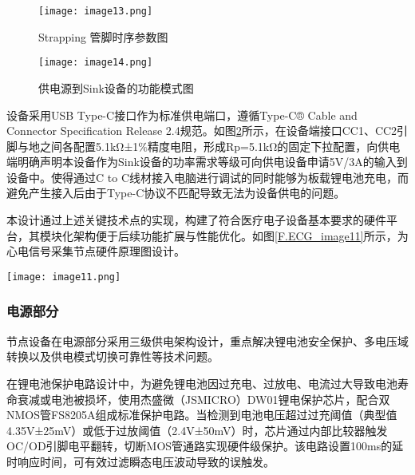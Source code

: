 \begin{figure}[H]
    \centering
    \texttt{[image: image13.png]}
    \caption{Strapping 管脚时序参数图 \cite{espressif2021esp32c3}}
    \label{F.ECG_image13}
\end{figure}

\begin{figure}[hbt]%
    \centering
    \texttt{[image: image14.png]}
    \caption{供电源到Sink设备的功能模式图\cite{usbtypec24}}
    \label{F.ECG_image14}
\end{figure}

设备采用USB Type-C接口作为标准供电端口，遵循Type-C® Cable and Connector Specification Release 2.4规范。如图\ref{F.ECG_image14}所示，在设备端接口CC1、CC2引脚与地之间各配置5.1kΩ±1$\%$精度电阻，形成Rp=5.1kΩ的固定下拉配置，向供电端明确声明本设备作为Sink设备的功率需求等级可向供电设备申请5V/3A的输入到设备中。使得通过C to C线材接入电脑进行调试的同时能够为板载锂电池充电，而避免产生接入后由于Type-C协议不匹配导致无法为设备供电的问题。

本设计通过上述关键技术点的实现，构建了符合医疗电子设备基本要求的硬件平台，其模块化架构便于后续功能扩展与性能优化。如图\ref{F.ECG_image11}所示，为心电信号采集节点硬件原理图设计。

\begin{sidewaysfigure}
    \centering
    \texttt{[image: image11.png]}
    \caption{心电信号采集节点主控部分硬件原理图设计}
    \label{F.ECG_image11}
\end{sidewaysfigure}

\newpage    %

\subsubsection{电源部分}

节点设备在电源部分采用三级供电架构设计，重点解决锂电池安全保护、多电压域转换以及供电模式切换可靠性等技术问题。

在锂电池保护电路设计中，为避免锂电池因过充电、过放电、电流过大导致电池寿命衰减或电池被损坏，使用杰盛微（JSMICRO）DW01锂电保护芯片，配合双NMOS管FS8205A组成标准保护电路。当检测到电池电压超过过充阈值（典型值4.35V±25mV）或低于过放阈值（2.4V±50mV）时，芯片通过内部比较器触发OC/OD引脚电平翻转，切断MOS管通路实现硬件级保护。该电路设置100ms的延时响应时间，可有效过滤瞬态电压波动导致的误触发。\cite{便携式心电和脉搏监测装置设计}

